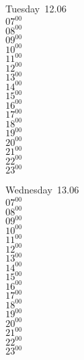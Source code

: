 \documentclass[11pt, a4paper]{book}\usepackage[]{graphicx}\usepackage[]{color}
\begin{document}
\begin{weekdaybox}
  Tuesday~12.06\\
  { 
  \vfill
  $07^{00}$\\
$08^{00}$\\
$09^{00}$\\
$10^{00}$\\
$11^{00}$\\
$12^{00}$\\
$13^{00}$\\
$14^{00}$\\
$15^{00}$\\
$16^{00}$\\
$17^{00}$\\
$18^{00}$\\
$19^{00}$\\
$20^{00}$\\
$21^{00}$\\
$22^{00}$\\
$23^{00}$\\
  }
\end{weekdaybox}
\begin{weekdaybox}
  Wednesday~13.06\\
  { 
  \vfill
  $07^{00}$\\
$08^{00}$\\
$09^{00}$\\
$10^{00}$\\
$11^{00}$\\
$12^{00}$\\
$13^{00}$\\
$14^{00}$\\
$15^{00}$\\
$16^{00}$\\
$17^{00}$\\
$18^{00}$\\
$19^{00}$\\
$20^{00}$\\
$21^{00}$\\
$22^{00}$\\
$23^{00}$\\
  }
\end{weekdaybox}
\clearpage
\begin{headerbox}
\end{headerbox}
\end{document}
